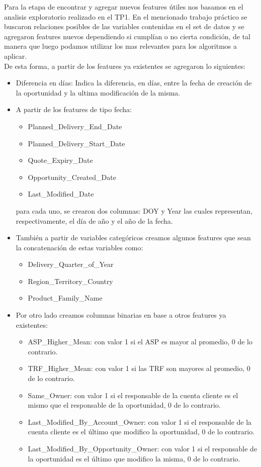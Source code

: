 \documentclass[12pt,a4paper]{article}
\begin{document}
Para la etapa de encontrar y agregar nuevos features útiles nos basamos en el analisis exploratorio realizado en el TP1.
En el mencionado trabajo práctico se buscaron relaciones posibles de las variables contenidas en el set de
datos y se agregaron features nuevos dependiendo si cumplían o no cierta condición, de tal manera que luego podamos utilizar los mas relevantes para los algoritmos a aplicar.\\

De esta forma, a partir de los features ya existentes se agregaron lo siguientes:
\begin{itemize}
    \item Diferencia en días: Indica la diferencia, en días, entre la fecha de creación de la oportunidad y la ultima modificación de la misma.
    \item A partir de los features de tipo fecha:
    \begin{itemize}
        \item Planned\_Delivery\_End\_Date
        \item Planned\_Delivery\_Start\_Date
        \item Quote\_Expiry\_Date
        \item Opportunity\_Created\_Date
        \item Last\_Modified\_Date
    \end{itemize}
    para cada uno, se crearon dos columnas: DOY y Year las cuales representan, respectivamente, el día de año y el año de la fecha.
    \item También a partir de variables categóricos creamos algunos features que sean la concatenación de estas variables como:
    \begin{itemize}
        \item Delivery\_Quarter\_of\_Year
        \item Region\_Territory\_Country
        \item Product\_Family\_Name
    \end{itemize}
    \item Por otro lado creamos columnas binarias en base a otros features ya existentes:
    \begin{itemize}
        \item ASP\_Higher\_Mean: con valor 1 si el ASP es mayor al promedio, 0 de lo contrario.
        \item TRF\_Higher\_Mean: con valor 1 si las TRF son mayores al promedio, 0 de lo contrario.
        \item Same\_Owner: con valor 1 si el responsable de la cuenta cliente es el mismo que el responsable de la oportunidad, 0 de lo contrario. 
        \item Last\_Modified\_By\_Account\_Owner: con valor 1 si el responsable de la cuenta cliente es el último que modifico la  oportunidad, 0 de lo contrario.
        \item Last\_Modified\_By\_Opportunity\_Owner: con valor 1 si el responsable de la oportunidad  es el último que modifico la  misma, 0 de lo contrario.
    \end{itemize}
\end{itemize}
\end{document}
